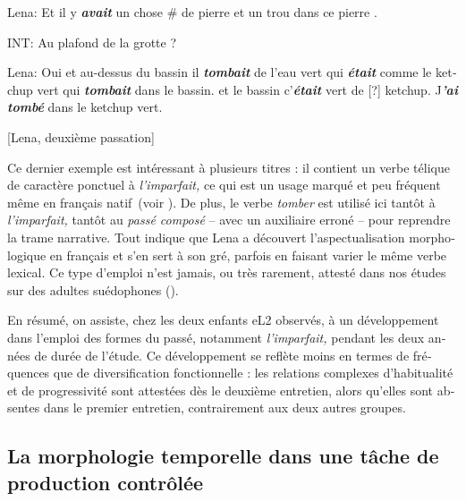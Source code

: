 \documentclass[french, output=paper]{langscibook}
\begin{document}
\begin{otherlanguage}{french}
\ea \label{ex:kihlstedt:4}   Lena:  Et il y \textbf{\textit{avait}}  un chose \# de pierre et un trou dans ce pierre .



    INT:  Au plafond de la grotte ?



  Lena:  Oui et au-dessus du bassin il \textbf{\textit{tombait}} de l'eau vert qui \textbf{\textit{était}} comme le ketchup vert qui \textbf{\textit{tombait}} dans le bassin. et le bassin c’\textbf{\textit{était}} vert de [?] ketchup. J\textbf{\textit{’ai} \textit{tombé}} dans le ketchup vert. 
  
  \hfill[Lena, deuxième passation]
\z


Ce dernier exemple est intéressant à plusieurs titres : il contient un verbe télique de caractère ponctuel à \textit{l’imparfait,} ce qui est un usage marqué et peu fréquent même en français natif~(voir \citealt{IzquierdoKihlstedt2019}). De plus, le verbe \textit{tomber} est utilisé ici tantôt à \textit{l’imparfait,} tantôt au \textit{passé composé} -- avec un auxiliaire erroné -- pour reprendre la trame narrative. Tout indique que Lena a découvert l’aspectualisation morphologique en français et s’en sert à son gré, parfois en faisant varier le même verbe lexical. Ce type d’emploi n’est jamais, ou très rarement, attesté dans nos études sur des adultes suédophones (\citealt{Kihlstedt2002, Kihlstedt2009, Kihlstedt2015}).



En résumé, on assiste, chez les deux enfants eL2 observés, à un développement dans l’emploi des formes du passé, notamment \textit{l’imparfait,} pendant les deux années de durée de l’étude. Ce développement se reflète moins en termes de fréquences que de diversification fonctionnelle : les relations complexes d’habitualité et de progressivité sont attestées dès le deuxième entretien, alors qu’elles sont absentes dans le premier entretien, contrairement aux deux autres groupes.


\subsection{La morphologie temporelle dans une tâche de production contrôlée}\label{sec:kihlstedt:5.2}


\end{otherlanguage}
\end{document}
